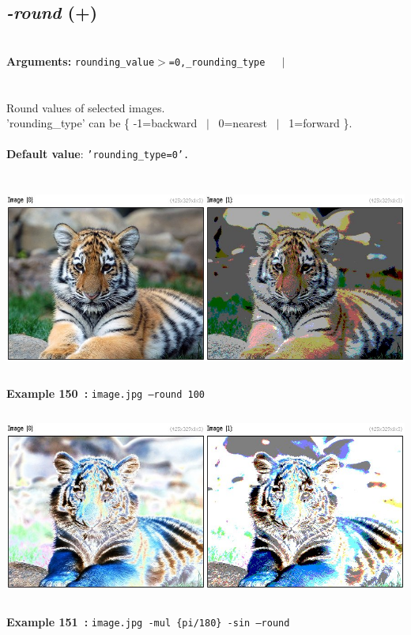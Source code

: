 \documentclass[a4paper,11pt,twoside]{book}
\begin{document}
\subsection{\emph{-round} (+)}\vspace*{-0.5em}
~\\\textbf{Arguments: } 
{\small \texttt{rounding\_value$>$=0,\_rounding\_type}}~~~$|$\\
\\~\\
Round values of selected images.
~\\'rounding\_type' can be \{ -1=backward ~$|$~ 0=nearest ~$|$~ 1=forward \}.
~\\~\\\textbf{Default value}: {\small \texttt{'rounding\_type=0'.}}
\begin{center}\includegraphics[keepaspectratio=true,height=7cm,width=\textwidth]{img/gmic_def150.jpg}\\
{\footnotesize \textbf{Example 150~:} \texttt{image.jpg --round 100}}
\\\includegraphics[keepaspectratio=true,height=7cm,width=\textwidth]{img/gmic_def151.jpg}\\
{\footnotesize \textbf{Example 151~:} \texttt{image.jpg -mul \{pi/180\} -sin --round}}
\end{center}
\end{document}
